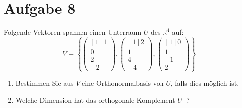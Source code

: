 \documentclass[main.tex]{subfiles}
\begin{document}
\section{Aufgabe 8}
Folgende Vektoren spannen einen Unterraum $U$ des $\mathbb{R}^{4}$ auf:
\begin{equation*}
V=\left\{\begin{pmatrix}[1]
1\\
0\\
2\\
-2
\end{pmatrix} ,\begin{pmatrix}[1]
2\\
1\\
4\\
-4
\end{pmatrix} ,\begin{pmatrix}[1]
0\\
1\\
-1\\
2
\end{pmatrix}\right\}
\end{equation*}

\begin{enumerate}
    \item Bestimmen Sie aus $V$ eine Orthonormalbasis von $U$, falls dies möglich ist.
    \item Welche Dimension hat das orthogonale Komplement $U^{\perp }$?
\end{enumerate}
\end{document}
